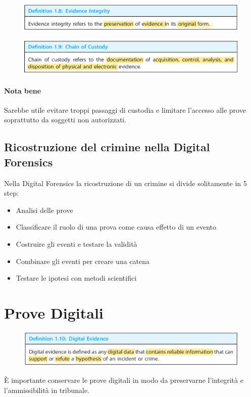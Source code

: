 \begin{figure}[h]
    \includegraphics[width=\textwidth]{Capitolo 1/Figure/evidence-integrity.png}
\end{figure}

\begin{figure}[h]
    \includegraphics[width=\textwidth]{Capitolo 1/Figure/chain-of-custody.png}
\end{figure}

\paragraph{Nota bene}
Sarebbe utile evitare troppi passaggi di custodia e limitare l'accesso alle prove soprattutto da soggetti non autorizzati.

\subsection{Ricostruzione del crimine nella Digital Forensics}
Nella Digital Forensics la ricostruzione di un crimine si divide solitamente in 5 step:
\begin{itemize}
    \item Analisi delle prove
    \item Classificare il ruolo di una prova come causa effetto di un evento
    \item Costruire gli eventi e testare la validità
    \item Combinare gli eventi per creare una catena
    \item Testare le ipotesi con metodi scientifici
\end{itemize}


\section{Prove Digitali}
\begin{figure}[h]
    \includegraphics[width=\textwidth]{Capitolo 1/Figure/digital-evidence.png}
\end{figure}
È importante conservare le prove digitali in modo da preservarne l'integrità e l'ammissibilità in tribunale.

